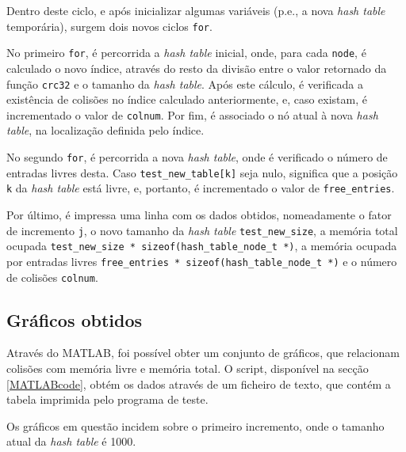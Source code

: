\documentclass[portuguese,11pt,a4paper,titlepage]{article}
\newcommand{\srcdir}{..}
\newcommand{\hashtablegrowdir}{\srcdir/hash\_table\_grow-test}
\begin{document}


Dentro deste ciclo, e após inicializar algumas variáveis (p.e., a nova \textit{hash table} temporária), surgem dois novos ciclos \verb|for|.

No primeiro \verb|for|, é percorrida a \textit{hash table} inicial, onde, para cada \verb|node|, é calculado o novo índice, através do resto da divisão entre o valor retornado da função \verb|crc32| e o tamanho da \textit{hash table}. Após este cálculo, é verificada a existência de colisões no índice calculado anteriormente, e, caso existam, é incrementado o valor de \verb|colnum|. Por fim, é associado o nó atual à nova \textit{hash table}, na localização definida pelo índice.



No segundo \verb|for|, é percorrida a nova \textit{hash table}, onde é verificado o número de entradas livres desta. Caso \lstinline|test_new_table[k]| seja nulo, significa que a posição \verb|k| da \textit{hash table} está livre, e, portanto, é incrementado o valor de \verb|free_entries|.



Por último, é impressa uma linha com os dados obtidos, nomeadamente o fator de incremento \verb|j|, o novo tamanho da \textit{hash table} \verb|test_new_size|, a memória total ocupada \lstinline|test_new_size * sizeof(hash_table_node_t *)|, a memória ocupada por entradas livres \lstinline|free_entries * sizeof(hash_table_node_t *)| e o número de colisões \verb|colnum|.



\subsection{Gráficos obtidos}
Através do MATLAB, foi possível obter um conjunto de gráficos, que relacionam colisões com memória livre e memória total. O script, disponível na secção \ref{MATLABcode}, obtém os dados através de um ficheiro de texto, que contém a tabela imprimida pelo programa de teste.

Os gráficos em questão incidem sobre o primeiro incremento, onde o tamanho atual da \textit{hash table} é 1000.
\end{document}

